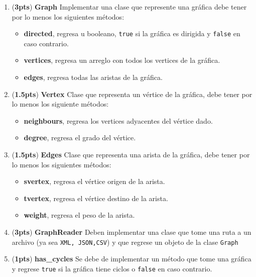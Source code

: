 \documentclass{article}
\newcommand{\grade}[1]{(\textbf{#1pts}) }
\begin{document}
\begin{enumerate}

\item \grade{3} \textbf{Graph} Implementar una clase que represente una gráfica debe tener por lo menos los siguientes métodos:

  \begin{itemize}
  \item \textbf{directed}, regresa u booleano, \texttt{true} si la gráfica es dirigida y \texttt{false} en caso contrario.
  \item \textbf{vertices}, regresa un arreglo con todos los vertices de la gráfica.
  \item \textbf{edges}, regresa todas las aristas de la gráfica.
  \end{itemize}

\item \grade{1.5} \textbf{Vertex} Clase que representa un vértice de la gráfica, debe tener por lo menos los siguiente métodos:

  \begin{itemize}
  \item \textbf{neighbours}, regresa los vertices adyacentes del vértice dado.
  \item \textbf{degree}, regresa el grado del vértice.
  \end{itemize}

\item \grade{1.5} \textbf{Edges} Clase que representa una arista de la gráfica, debe tener por lo menos los siguientes métodos:

  \begin{itemize}
  \item \textbf{svertex}, regresa el vértice origen de la arista.
  \item \textbf{tvertex}, regresa el vértice destino de la arista.
  \item \textbf{weight}, regresa el peso de la arista.
  \end{itemize}

 \item \grade{3} \textbf{GraphReader} Deben implementar una clase que tome una ruta a un archivo (ya sea \texttt{XML, JSON,CSV}) y que regrese un objeto de la clase \texttt{Graph}

 \item \grade{1} \textbf{has\_cycles} Se debe de implementar un método que tome una gráfica y regrese \texttt{true} si la gráfica tiene ciclos o \texttt{false} en caso contrario.


\end{enumerate}
\end{document}
